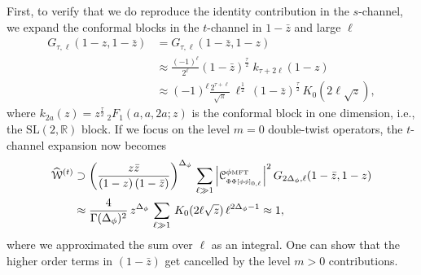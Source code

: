\documentclass[11pt]{article}
\newcommand{\zb}{\bar{z}}
\newcommand{\cope}[1]{\mathcal{C}_{_{#1}}}
\newcommand{\mft}{\text{\tiny MFT}}
\begin{document}
First, to verify that we do reproduce the identity contribution in the $s$-channel, we expand the conformal blocks in the $t$-channel in $1-\zb$ and large $\ell$
%
\begin{equation}\label{eq:tchannelapprox}
\begin{split}
G_{\tau,\ell}(1-z,1-\zb) 
&= 
  G_{\tau,\ell}(1-\zb,1-z) \\
&\approx 
    \frac{(-1)^{\ell}}{2^{\ell}}(1-\zb)^{\frac{\tau}{2}} \; k_{\tau+2\ell}(1-z) \\
&\approx 
    (-1)^{\ell}\frac{2^{\tau+\ell}}{\sqrt{\pi}} \, \ell^{\frac{1}{2}} \, (1-\zb)^{\frac{\tau}{2}} \, K_{0}(2\ell\sqrt{z}),
\end{split}
\end{equation}
%
where $k_{2a}(z) = z^{\frac{\tau}{2}} \, {}_{2}{F}_{1}(a,a,2a;z)$ is the conformal block in one dimension, i.e., the $\mathrm{SL}(2,\mathbb{R})$ block. If we focus on the level $m=0$ double-twist operators, the $t$-channel expansion now becomes
%
\begin{equation}\label{eq:idfromsum}
\begin{split}
\widehat{\mathcal{W}}^{(t)} 
&\supset 
  \left(\frac{z\zb}{(1-z) \, (1-\zb)}\right)^{\Delta_{\phi}} \, 
  \sum_{\ell \gg 1}
    \abs{\cope{\Phi\Phi[\phi\phi]_{0,\ell}}^{\phi\mft}}^{2}\,G_{2\Delta_{\phi},\ell}(1-\zb,1-z) \\
&\approx 
  \frac{4}{\Gamma(\Delta_{\phi})^{2}}\, z^{\Delta_{\phi}}\,
  \sum_{\ell \gg 1} \, K_{0}(2\ell\sqrt{z})\,
    \ell^{2\Delta_{\phi}-1} \approx 1,
\end{split}
\end{equation}
%
where we approximated the sum over $\ell$ as an integral. One can show that the higher order terms in $(1-\zb)$ get cancelled by the level $m>0$ contributions.
\end{document}
